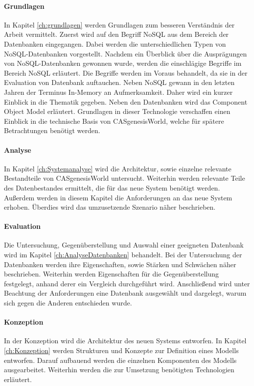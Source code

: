 \paragraph{Grundlagen} In Kapitel \ref{ch:grundlagen} werden Grundlagen zum besseren Verständnis der Arbeit vermittelt. Zuerst wird auf den Begriff NoSQL aus dem Bereich der Datenbanken eingegangen. Dabei werden die unterschiedlichen Typen von NoSQL-Datenbanken vorgestellt. Nachdem ein Überblick über die Ausprägungen von NoSQL-Datenbanken gewonnen wurde, werden die einschlägige Begriffe im Bereich NoSQL erläutert. Die Begriffe werden im Voraus behandelt, da sie in der Evaluation von Datenbank auftauchen. Neben NoSQL gewann in den letzten Jahren der Terminus In-Memory an Aufmerksamkeit. Daher wird ein kurzer Einblick in die Thematik gegeben. Neben den Datenbanken wird das Component Object Model erläutert. Grundlagen in dieser Technologie verschaffen einen Einblick in die technische Basis von CASgenesisWorld, welche für spätere Betrachtungen benötigt werden. 

\paragraph{Analyse} In Kapitel \ref{ch:Systemanalyse} wird die Architektur, sowie einzelne relevante Bestandteile von CASgenesisWorld untersucht. Weiterhin werden relevante Teile des Datenbestandes ermittelt, die für das neue System benötigt werden. Außerdem werden in diesem Kapitel die Anforderungen an das neue System erhoben. Überdies wird das umzusetzende Szenario näher beschrieben. 

\paragraph{Evaluation} Die Untersuchung, Gegenüberstellung und Auswahl einer geeigneten Datenbank wird im Kapitel \ref{ch:AnalyseDatenbanken} behandelt. Bei der Untersuchung der Datenbanken werden ihre Eigenschaften, sowie Stärken und Schwächen näher beschrieben. Weiterhin werden Eigenschaften für die Gegenüberstellung festgelegt, anhand derer ein Vergleich durchgeführt wird. Anschließend wird unter Beachtung der Anforderungen eine Datenbank ausgewählt und dargelegt, warum sich gegen die Anderen entschieden wurde.  

\paragraph{Konzeption} In der Konzeption wird die Architektur des neuen Systems entworfen. In Kapitel \ref{ch:Konzeption} werden Strukturen und Konzepte zur Definition eines Modells entworfen. Darauf aufbauend werden die einzelnen Komponenten des Modells ausgearbeitet. Weiterhin werden die zur Umsetzung benötigten Technologien  erläutert. 

